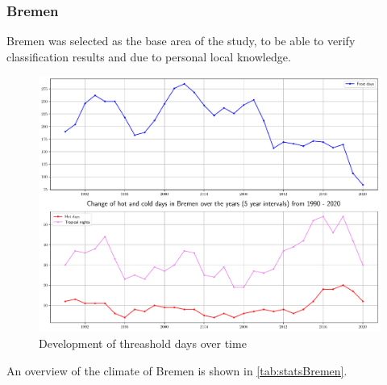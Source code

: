 \documentclass[12pt,a4paper, english,twoside]{article}
\begin{document}
  \subsubsection{Bremen}
  Bremen was selected as the base area of the study, to be able to verify classification results and due to personal local knowledge. 
    \begin{figure}[!htbp]
     \centering
        \includegraphics[width=\textwidth]{img/BremenKIChanges}
        \caption{Development of threashold days over time\label{fig:climateovertimeBremen}}
   \end{figure}
   An overview of the climate of Bremen is shown in \cref{tab:statsBremen}.
\end{document}
